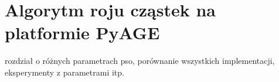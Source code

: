 \chapter{Algorytm roju cząstek na platformie PyAGE}
\label{cha:psoTesty}

rozdział o różnych parametrach pso, porównanie wszystkich implementacji, eksperymenty z parametrami itp.








